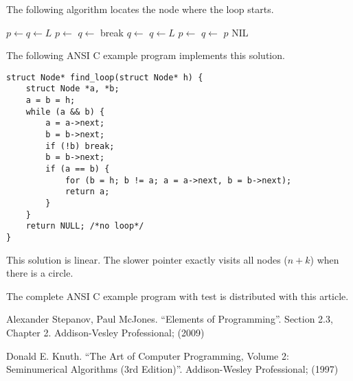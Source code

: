 \documentclass{article}
\begin{document}
The following algorithm locates the node where the loop starts.

\begin{algorithmic}[1]
  \State $p \gets q \gets L$
    \State $p \gets$ 
    \State $q \gets$ 
      \State break
    \EndIf
    \State $q \gets$ 
      \State $q \gets L$
        \State $p \gets$ 
        \State $q \gets$ 
      \EndWhile
      \State \Return $p$ 
    \EndIf
  \EndWhile
  \State \Return NIL 
\EndFunction
\end{algorithmic}

The following ANSI C example program implements this solution.

\lstset{language=C}
\begin{lstlisting}
struct Node* find_loop(struct Node* h) {
    struct Node *a, *b;
    a = b = h;
    while (a && b) {
        a = a->next;
        b = b->next;
        if (!b) break;
        b = b->next;
        if (a == b) {
            for (b = h; b != a; a = a->next, b = b->next);
            return a;
        }
    }
    return NULL; /*no loop*/
}
\end{lstlisting}

This solution is linear. The slower pointer exactly visits all nodes ($n + k$) when there is a circle.

The complete ANSI C example program with test is distributed with this article.

\begin{thebibliography}{99}

Alexander Stepanov, Paul McJones. ``Elements of Programming''. Section 2.3, Chapter 2. Addison-Vesley Professional; (2009)

Donald E. Knuth. ``The Art of Computer Programming, Volume 2: Seminumerical Algorithms (3rd Edition)''. Addison-Wesley Professional; (1997)

\end{thebibliography}
\end{document}
